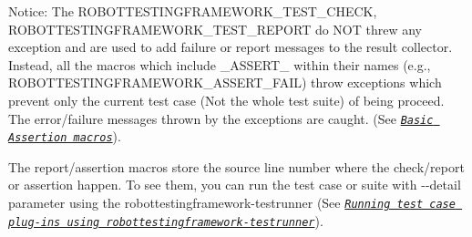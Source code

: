 

Notice\+: The {\ttfamily R\+O\+B\+O\+T\+T\+E\+S\+T\+I\+N\+G\+F\+R\+A\+M\+E\+W\+O\+R\+K\+\_\+\+T\+E\+S\+T\+\_\+\+C\+H\+E\+CK}, {\ttfamily R\+O\+B\+O\+T\+T\+E\+S\+T\+I\+N\+G\+F\+R\+A\+M\+E\+W\+O\+R\+K\+\_\+\+T\+E\+S\+T\+\_\+\+R\+E\+P\+O\+RT} do N\+OT threw any exception and are used to add failure or report messages to the result collector. Instead, all the macros which include {\ttfamily \+\_\+\+A\+S\+S\+E\+R\+T\+\_\+} within their names (e.\+g., {\ttfamily R\+O\+B\+O\+T\+T\+E\+S\+T\+I\+N\+G\+F\+R\+A\+M\+E\+W\+O\+R\+K\+\_\+\+A\+S\+S\+E\+R\+T\+\_\+\+F\+A\+IL}) throw exceptions which prevent only the current test case (Not the whole test suite) of being proceed. The error/failure messages thrown by the exceptions are caught. (See \href{http://robotology.github.io/robot-testing-framework/documentation/TestAssert_8h.html}{\tt {\itshape Basic Assertion macros}}).

The report/assertion macros store the source line number where the check/report or assertion happen. To see them, you can run the test case or suite with {\ttfamily -\/-\/detail} parameter using the {\ttfamily robottestingframework-\/testrunner} (See \href{http://robotology.github.io/robot-testing-framework/documentation/robottestingframework-testrunner.html}{\tt {\itshape Running test case plug-\/ins using robottestingframework-\/testrunner}}).


